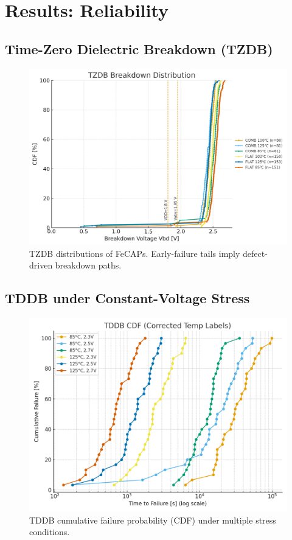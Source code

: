 \documentclass[conference]{IEEEtran}
\newcommand{\figw}{0.90\linewidth}
\begin{document}
\FloatBarrier

\section{Results: Reliability}

\subsection{Time-Zero Dielectric Breakdown (TZDB)}
\begin{figure}[!htb]
  \centering
  \includegraphics[width=\figw]{figures/fig3_tzdb.png}
  \caption{TZDB distributions of FeCAPs. Early-failure tails imply defect-driven breakdown paths.}
  \label{fig:tzdb}
\end{figure}

\subsection{TDDB under Constant-Voltage Stress}
\begin{figure}[!htb]
  \centering
  \includegraphics[width=\figw]{figures/fig4_tddb_cdf.png}
  \caption{TDDB cumulative failure probability (CDF) under multiple stress conditions.}
  \label{fig:tddb_cdf}
\end{figure}
\end{document}
